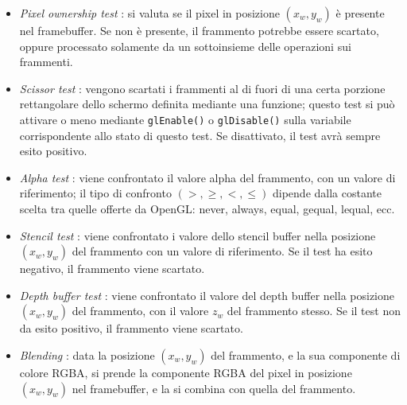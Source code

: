 \begin{itemize}
\item \emph{Pixel ownership test} : si valuta se il pixel in posizione $(x_w,y_w)$ è presente nel framebuffer. Se non è presente, il frammento potrebbe essere scartato, oppure processato solamente da un sottoinsieme delle operazioni sui frammenti.
\item \emph{Scissor test} : vengono scartati i frammenti al di fuori di una certa porzione rettangolare dello schermo definita mediante una funzione; questo test si può attivare o meno mediante \texttt{glEnable()} o \texttt{glDisable()} sulla variabile corrispondente allo stato di questo test. Se disattivato, il test avrà sempre esito positivo.
\item \emph{Alpha test} : viene confrontato il valore alpha del frammento, con un valore di riferimento; il tipo di confronto $(>,\geq,<,\leq)$ dipende dalla costante scelta tra quelle offerte da OpenGL: never, always, equal, gequal, lequal, ecc.
\item \emph{Stencil test} : viene confrontato i valore dello stencil buffer nella posizione $(x_w,y_w)$ del frammento con un valore di riferimento. Se il test ha esito negativo, il frammento viene scartato.
\item \emph{Depth buffer test} : viene confrontato il valore del depth buffer nella posizione $(x_w,y_w)$ del frammento, con il valore $z_w$ del frammento stesso. Se il test non da esito positivo, il frammento viene scartato. 
\item \emph{Blending} : data la posizione $(x_w,y_w)$ del frammento, e la sua componente di colore RGBA, si prende la componente RGBA del pixel in posizione $(x_w,y_w)$ nel framebuffer, e la si combina con quella del frammento.

\end{itemize}
